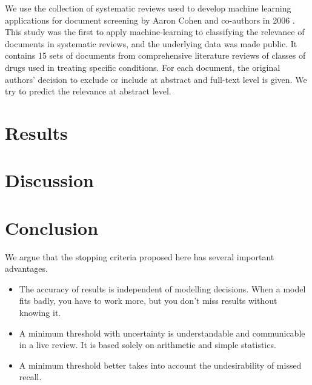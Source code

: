 \documentclass{bmcart}
\begin{document}
	
	
	
	We use the collection of systematic reviews used to develop machine learning applications for document screening by Aaron Cohen and co-authors in 2006 \cite{Cohen2006}. This study was the first to apply machine-learning to classifying the relevance of documents in systematic reviews, and the underlying data was made public. It contains 15 sets of documents from comprehensive literature reviews of classes of drugs used in treating specific conditions. For each document, the original authors' decision to exclude or include at abstract and full-text level is given. We try to predict the relevance at abstract level.
	
	\section*{Results}
	
	\section*{Discussion}
	
	\section*{Conclusion}
	
	We argue that the stopping criteria proposed here has several important advantages.
	
	\begin{itemize}
		\item The accuracy of results is independent of modelling decisions. When a model fits badly, you have to work more, but you don't miss results without knowing it.
		\item A minimum threshold with uncertainty is understandable and communicable in a live review. It is based solely on arithmetic and simple statistics.
		\item A minimum threshold better takes into account the undesirability of missed recall.
	\end{itemize}
	
\end{document}
